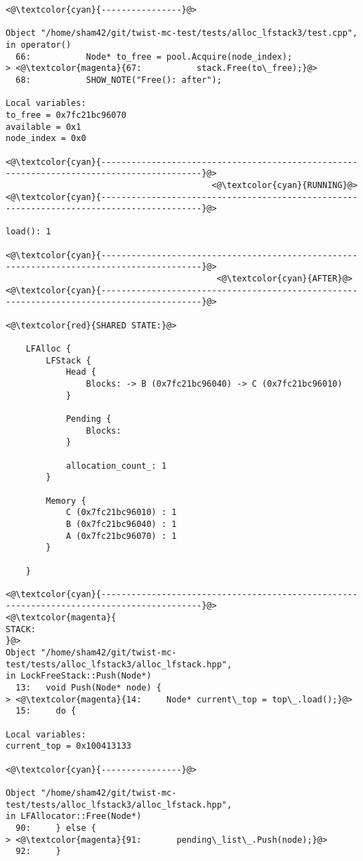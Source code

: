 \begin{adjustwidth}{-3.3cm}{-1cm}
\begin{allintypewriter}
\begin{multicols*}{2}
\begin{lstlisting}[numbers=none]
<@\textcolor{cyan}{----------------}@>

Object "/home/sham42/git/twist-mc-test/tests/alloc_lfstack3/test.cpp",
in operator()
  66:           Node* to_free = pool.Acquire(node_index);
> <@\textcolor{magenta}{67:           stack.Free(to\_free);}@>
  68:           SHOW_NOTE("Free(): after");

Local variables: 
to_free = 0x7fc21bc96070
available = 0x1
node_index = 0x0

<@\textcolor{cyan}{------------------------------------------------------------------------------------------}@>
                                         <@\textcolor{cyan}{RUNNING}@>
<@\textcolor{cyan}{------------------------------------------------------------------------------------------}@>

load(): 1

<@\textcolor{cyan}{------------------------------------------------------------------------------------------}@>
                                          <@\textcolor{cyan}{AFTER}@>
<@\textcolor{cyan}{------------------------------------------------------------------------------------------}@>

<@\textcolor{red}{SHARED STATE:}@>

    LFAlloc {
	    LFStack {
		    Head {
			    Blocks: -> B (0x7fc21bc96040) -> C (0x7fc21bc96010) 
		    }

		    Pending {
			    Blocks: 
		    }

		    allocation_count_: 1
	    }

	    Memory {
		    C (0x7fc21bc96010) : 1
		    B (0x7fc21bc96040) : 1
		    A (0x7fc21bc96070) : 1
	    }

    }

<@\textcolor{cyan}{------------------------------------------------------------------------------------------}@>
<@\textcolor{magenta}{
STACK:
}@>
Object "/home/sham42/git/twist-mc-test/tests/alloc_lfstack3/alloc_lfstack.hpp",
in LockFreeStack::Push(Node*)
  13:   void Push(Node* node) {
> <@\textcolor{magenta}{14:     Node* current\_top = top\_.load();}@>
  15:     do {

Local variables: 
current_top = 0x100413133

<@\textcolor{cyan}{----------------}@>

Object "/home/sham42/git/twist-mc-test/tests/alloc_lfstack3/alloc_lfstack.hpp",
in LFAllocator::Free(Node*)
  90:     } else {
> <@\textcolor{magenta}{91:       pending\_list\_.Push(node);}@>
  92:     }


\end{lstlisting}
\end{multicols*}
\end{allintypewriter}
\end{adjustwidth}
